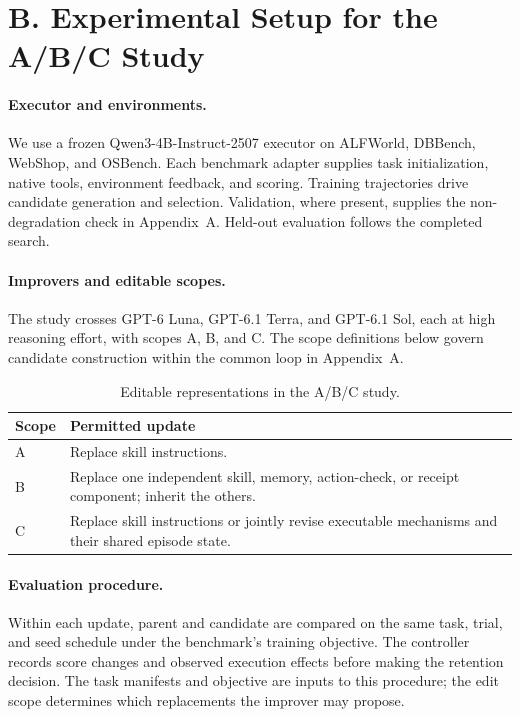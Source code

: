 \section*{B. Experimental Setup for the A/B/C Study}
\label{app:configurations}
\paragraph{Executor and environments.}
We use a frozen Qwen3-4B-Instruct-2507 executor on ALFWorld, DBBench, WebShop, and OSBench. Each benchmark adapter supplies task initialization, native tools, environment feedback, and scoring. Training trajectories drive candidate generation and selection. Validation, where present, supplies the non-degradation check in Appendix~A. Held-out evaluation follows the completed search.

\paragraph{Improvers and editable scopes.}
The study crosses GPT-6 Luna, GPT-6.1 Terra, and GPT-6.1 Sol, each at high reasoning effort, with scopes A, B, and C. The scope definitions below govern candidate construction within the common loop in Appendix~A.

\begin{table}[h]
\centering\small
\caption{Editable representations in the A/B/C study.}
\label{tab:scope-settings}
\begin{tabularx}{\linewidth}{@{}lX@{}}
\toprule
Scope & Permitted update\\
\midrule
A & Replace skill instructions.\\
B & Replace one independent skill, memory, action-check, or receipt component; inherit the others.\\
C & Replace skill instructions or jointly revise executable mechanisms and their shared episode state.\\
\bottomrule
\end{tabularx}
\end{table}

\paragraph{Evaluation procedure.}
Within each update, parent and candidate are compared on the same task, trial, and seed schedule under the benchmark's training objective. The controller records score changes and observed execution effects before making the retention decision. The task manifests and objective are inputs to this procedure; the edit scope determines which replacements the improver may propose.

